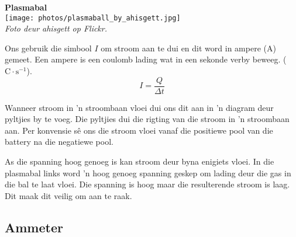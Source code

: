 \begin{minipage}{.5\textwidth}
\begin{center}
\textbf{Plasmabal}\\
\texttt{[image: photos/plasmaball\_by\_ahisgett.jpg]}\\
\textit{Foto deur ahisgett op Flickr.}
\end{center}   
\end{minipage}
\begin{minipage}{.5\textwidth}
Ons gebruik die simbool $I$ om stroom aan te dui en dit word in ampere
(A) gemeet. Een ampere is een coulomb lading wat in een sekonde verby beweeg.
($\text{C} \cdot \text{s}^{-1}$).
\begin{equation*}
\boxed{I = \frac{Q}{\Delta t}}
\end{equation*}

Wanneer stroom in 'n stroombaan vloei dui ons dit aan in 'n diagram deur
pyltjies by te voeg. Die pyltjies dui die rigting van die
stroom in 'n stroombaan aan. Per konvensie s\^e ons die stroom vloei vanaf die
positiewe pool van die battery na die negatiewe pool.

As die spanning hoog genoeg is kan stroom deur byna enigiets vloei. In die
plasmabal links word 'n hoog genoeg spanning geskep om lading deur die gas in
die bal te laat vloei. Die spanning is hoog maar die resulterende stroom is
laag. Dit maak dit veilig om aan te raak.
\end{minipage}

\clearpage


\subsection*{Ammeter}

